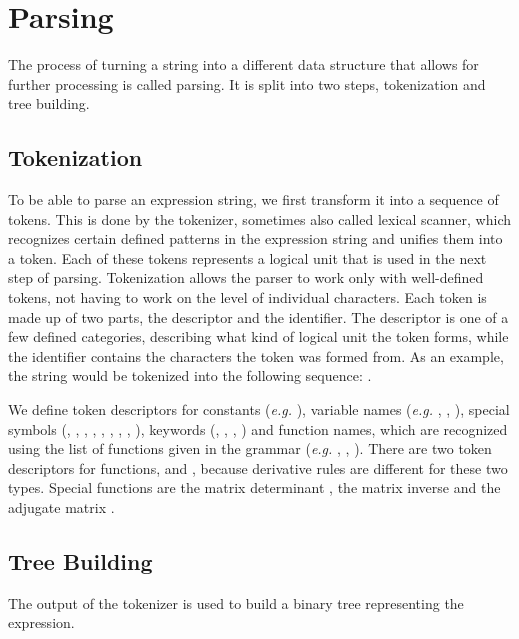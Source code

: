 \documentclass[12pt, a4paper]{report}
\begin{document}
\section{Parsing}
The process of turning a string into a different data structure that allows for further processing is called parsing.
It is split into two steps, tokenization and tree building.

\subsection{Tokenization}
To be able to parse an expression string, we first transform it into a sequence of tokens.
This is done by the tokenizer, sometimes also called lexical scanner, which recognizes certain defined patterns in the expression string and unifies them into a token.
Each of these tokens represents a logical unit that is used in the next step of parsing.
Tokenization allows the parser to work only with well-defined tokens, not having to work on the level of individual characters.
Each token is made up of two parts, the descriptor and the identifier.
The descriptor is one of a few defined categories, describing what kind of logical unit the token forms, while the identifier contains the characters the token was formed from.
As an example, the string  would be tokenized into the following sequence: .

We define token descriptors for constants (\textit{e.g.} ), variable names (\textit{e.g.} , , ), special symbols (, , , , , , , , ), keywords (, , , ) and function names, which are recognized using the list of functions given in the grammar (\textit{e.g.}  , , ).
There are two token descriptors for functions,  and , because derivative rules are different for these two types.
Special functions are the matrix determinant , the matrix inverse  and the adjugate matrix .

\subsection{Tree Building}
The output of the tokenizer is used to build a binary tree representing the expression.
\end{document}
